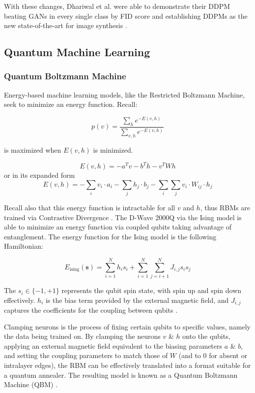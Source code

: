 \documentclass[%
 reprint,
 amsmath,amssymb,
 aps,
]{revtex4-2}
\begin{document}
With these changes, Dhariwal et al. were able to demonstrate their DDPM beating GANs in every single class by FID score and establishing DDPMs as the new state-of-the-art for image synthesis  \cite{dhariwal2021diffusion}.

\subsection{Quantum Machine Learning}
\subsubsection{Quantum Boltzmann Machine}
Energy-based machine learning models, like the Restricted Boltzmann Machine, seek to minimize an energy function. Recall:

\begin{equation}
p(v) = \frac{\sum_{h} e^{-E(v,h)}}{\sum_{v,h}e^{-E(v,h)}}
\end{equation}


is maximized when $E(v,h)$ is minimized.

\begin{equation}
E(v, h) = -a^Tv -b^Th -v^TWh
\end{equation}
or in its expanded form
\begin{equation}
E(v, h) = - \sum_{i} v_i \cdot a_i - \sum_{j} h_j \cdot b_j - \sum_{i} \sum_{j} v_i \cdot W_{ij} \cdot h_j
\end{equation}



Recall also that this energy function is intractable for all $v$ and $h$, thus RBMs are trained via Contrastive Divergence \cite{trainingrbms}. The D-Wave 2000Q  via the Ising model is able to minimize an energy function via coupled qubits taking advantage of entanglement. The energy function for the Ising model is the following Hamiltonian:

\begin{equation}
E_{\text{ising}}(\mathbf{s}) = \sum_{i=1}^N h_i s_i + \sum_{i=1}^N \sum_{j=i+1}^N J_{i,j} s_i s_j
\end{equation}



The $s_i \in \{-1, +1\}$ represents the qubit spin state, with spin up and spin down effectively. $h_i$ is the bias term provided by the external magnetic field, and $J_{i,j}$ captures the coefficients for the coupling between qubits \cite{dwavedocs}.


Clamping neurons is the process of fixing certain qubits to specific values, namely the data being trained on. By clamping the neurons $v$ \& $h$ onto the qubits, applying an external magnetic field equivalent to the biasing parameters $a$ \& $b$, and setting the coupling parameters to match those of $W$ (and to 0 for absent or intralayer edges), the RBM can be effectively translated into a format suitable for a quantum annealer. The resulting model is known as a Quantum Boltzmann Machine (QBM) \cite{dwavedocs}.
\end{document}
